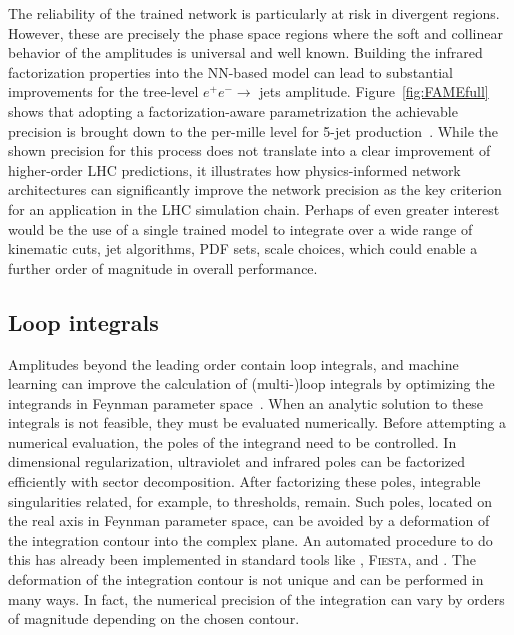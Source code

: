 \documentclass[submission,Phys]{SciPost}
\begin{document}
The reliability of the trained network is particularly at risk in divergent regions. However, these are precisely the phase space regions where the soft and collinear behavior of the amplitudes is universal and well known. Building the infrared factorization properties into the NN-based model can lead to substantial improvements for the tree-level $e^+e^-\to$ jets amplitude. Figure~\ref{fig:FAMEfull} shows that adopting a factorization-aware parametrization the achievable precision is brought down to the per-mille level for 5-jet production~\cite{Maitre:2021uaa}. While the shown precision for this process does not translate into a clear improvement of higher-order LHC predictions, it illustrates how physics-informed network architectures can significantly improve the network precision as the key criterion for an application in the LHC simulation chain. Perhaps of even greater interest would be the use of a single trained model to integrate over a wide range of kinematic cuts, jet algorithms, PDF sets, scale choices, which could enable a further order of magnitude in overall performance.

\subsection{Loop integrals}
\label{sec:generators_int}

Amplitudes beyond the leading order contain loop integrals, and machine learning can improve the calculation of (multi-)loop integrals by optimizing the integrands in Feynman parameter space~\cite{Winterhalder:2021ngy}. When an analytic solution to these integrals is not feasible, they must be evaluated numerically. Before attempting a numerical evaluation, the poles of the integrand need to be controlled. In dimensional regularization, ultraviolet and infrared poles can be factorized efficiently with sector decomposition. After factorizing these poles, integrable singularities related, for example, to thresholds, remain. Such poles, located on the real axis in Feynman parameter space, can be avoided by a deformation of the integration contour into the complex plane.
An automated procedure to do this has already been implemented in standard tools like \secdec, \textsc{Fiesta}, and  \pysecdec. 
The deformation of the integration contour is not unique and can be performed in many ways. In fact, the numerical precision of the integration can vary by orders of magnitude depending on the chosen contour.
\end{document}
